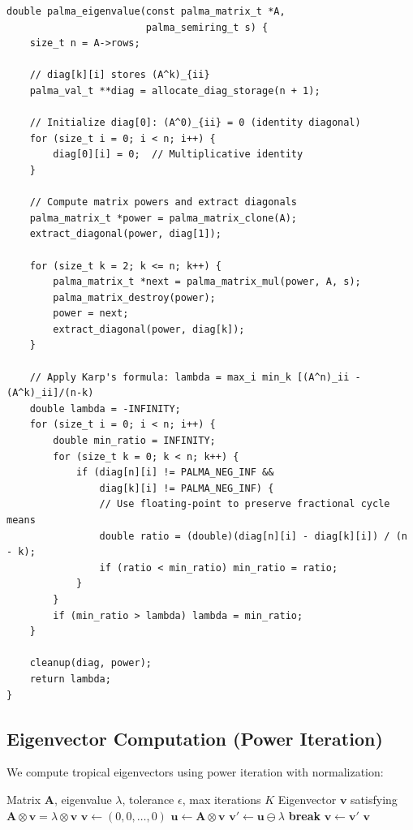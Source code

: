 \documentclass[11pt,a4paper]{article}
\theoremstyle{plain}
\theoremstyle{definition}
\newcommand{\mat}[1]{\mathbf{#1}}
\newcommand{\vect}[1]{\mathbf{#1}}
\begin{document}
\begin{lstlisting}[caption={Karp's algorithm implementation}]
double palma_eigenvalue(const palma_matrix_t *A,
                        palma_semiring_t s) {
    size_t n = A->rows;
    
    // diag[k][i] stores (A^k)_{ii}
    palma_val_t **diag = allocate_diag_storage(n + 1);
    
    // Initialize diag[0]: (A^0)_{ii} = 0 (identity diagonal)
    for (size_t i = 0; i < n; i++) {
        diag[0][i] = 0;  // Multiplicative identity
    }
    
    // Compute matrix powers and extract diagonals
    palma_matrix_t *power = palma_matrix_clone(A);
    extract_diagonal(power, diag[1]);
    
    for (size_t k = 2; k <= n; k++) {
        palma_matrix_t *next = palma_matrix_mul(power, A, s);
        palma_matrix_destroy(power);
        power = next;
        extract_diagonal(power, diag[k]);
    }
    
    // Apply Karp's formula: lambda = max_i min_k [(A^n)_ii - (A^k)_ii]/(n-k)
    double lambda = -INFINITY;
    for (size_t i = 0; i < n; i++) {
        double min_ratio = INFINITY;
        for (size_t k = 0; k < n; k++) {
            if (diag[n][i] != PALMA_NEG_INF && 
                diag[k][i] != PALMA_NEG_INF) {
                // Use floating-point to preserve fractional cycle means
                double ratio = (double)(diag[n][i] - diag[k][i]) / (n - k);
                if (ratio < min_ratio) min_ratio = ratio;
            }
        }
        if (min_ratio > lambda) lambda = min_ratio;
    }
    
    cleanup(diag, power);
    return lambda;
}
\end{lstlisting}

\subsection{Eigenvector Computation (Power Iteration)}

We compute tropical eigenvectors using power iteration with normalization:

\begin{algorithm}[htbp]
\caption{Tropical Power Iteration}
\label{alg:power-iteration}
\begin{algorithmic}[1]
\Require Matrix $\mat{A}$, eigenvalue $\lambda$, tolerance $\epsilon$, max iterations $K$
\Ensure Eigenvector $\vect{v}$ satisfying $\mat{A} \otimes \vect{v} = \lambda \otimes \vect{v}$
\State $\vect{v} \leftarrow (0, 0, \ldots, 0)$ 
    \State $\vect{u} \leftarrow \mat{A} \otimes \vect{v}$
    \State $\vect{v}' \leftarrow \vect{u} \ominus \lambda$ 
    \If{$\|\vect{v}' - \vect{v}\|_\infty < \epsilon$} \textbf{break}
    \EndIf
    \State $\vect{v} \leftarrow \vect{v}'$
\EndFor
\State \Return $\vect{v}$
\end{algorithmic}
\end{algorithm}
\end{document}
